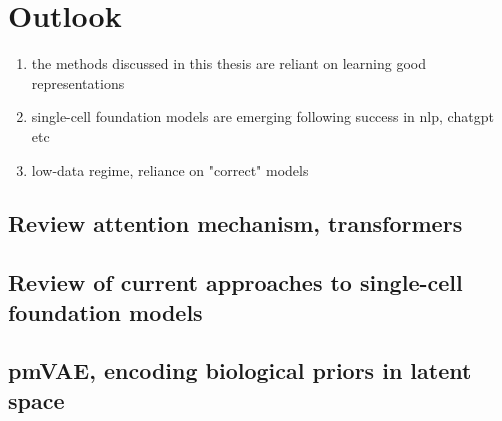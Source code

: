 \section{Outlook}
\begin{enumerate}
  \item the methods discussed in this thesis are reliant on learning good representations
  \item single-cell foundation models are emerging following success in nlp, chatgpt etc
  \item low-data regime, reliance on "correct" models
\end{enumerate}

\subsection{Review attention mechanism, transformers}
\subsection{Review of current approaches to single-cell foundation models}
\subsection{pmVAE, encoding biological priors in latent space}
